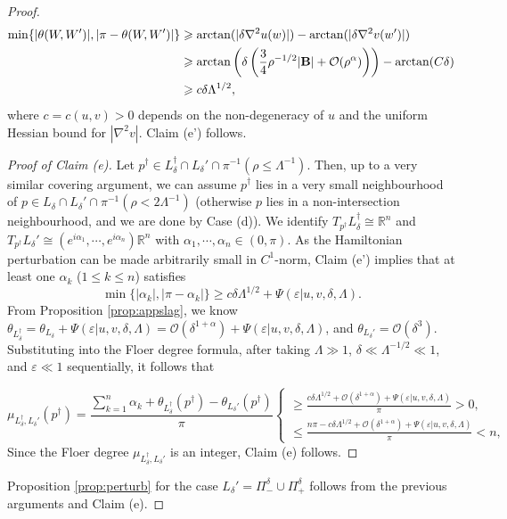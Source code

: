 \documentclass[11pt,a4paper]{article}
\numberwithin{equation}{section}%
\theoremstyle{definition}
\newcommand{\R}{\mathbb{R}}
\begin{document}
\begin{proof}
\begin{equation*}
    \begin{aligned}
        \min \{|\theta(W,W')|,|\pi-\theta(W,W')|\}&\geqslant \arctan(|\delta\nabla^2u(w)|)-\arctan (|\delta \nabla^2v(w')|)
        \\& \geqslant \arctan\left(\delta \left(\frac{3}{4}\rho^{-1/2}|{\bf{B}}|+\mathcal{O}(\rho^{\alpha})\right)\right)-\arctan(C\delta) 
        \\& \geqslant c\delta \Lambda^{1/2}, 
    \end{aligned}
\end{equation*}
where $c=c(u,v)>0$ depends on the non-degeneracy of $u$ and the uniform Hessian bound for $|\nabla^2 v|$. Claim (e') follows. 
\begin{proof}[Proof of Claim (e)]
   Let $p^\dagger\in L_\delta^\dagger\cap L_\delta'\cap \pi^{-1}(\rho\leqslant \Lambda^{-1})$. Then, up to a very similar covering argument, we can assume $p^\dagger$ lies in a very small neighbourhood of $p\in L_\delta\cap L_\delta'\cap \pi^{-1}(\rho <2\Lambda^{-1})$ (otherwise $p$ lies in a non-intersection neighbourhood, and we are done by Case (d)). We identify $T_{p^\dagger}L_\delta^\dagger\cong \R^n$ and $T_{p^{\dagger}}L_{\delta}'\cong (e^{i\alpha_1},\cdots,e^{i\alpha_n})\R^n$ with $\alpha_1,\cdots,\alpha_n\in (0,\pi)$. As the Hamiltonian perturbation can be made arbitrarily small in $C^1$-norm, Claim (e') implies that at least one $\alpha_k$ ($1\leqslant k\leqslant n$) satisfies
    $$\min\{|\alpha_k|,|\pi-\alpha_k|\}\geqslant c\delta \Lambda^{1/2}+\Psi(\varepsilon|u,v,\delta,\Lambda).$$
    From Proposition \ref{prop:appslag}, we know $\theta_{L_\delta^\dagger}=\theta_{L_\delta}+\Psi(\varepsilon|u,v,\delta,\Lambda)=\mathcal{O}(\delta^{1+\alpha})+\Psi(\varepsilon|u,v,\delta,\Lambda)$, and $\theta_{L_\delta'}=\mathcal{O}(\delta^3)$. Substituting into the Floer degree formula, after taking $\Lambda\gg 1$, $\delta \ll\Lambda^{-1/2}\ll1 $, and $\varepsilon \ll1$ sequentially, it follows that
    
    $$\mu_{L_\delta^{\dagger},L_{\delta}'}(p^\dagger)=\frac{\sum\limits_{k=1}^n\alpha_k+\theta_{L_\delta^\dagger}(p^\dagger)-\theta_{L_\delta'}(p^\dagger)}{\pi}\left\{\begin{array}{l}
        \geqslant \frac{c\delta \Lambda^{1/2}+\mathcal{O}(\delta^{1+\alpha})+\Psi(\varepsilon|u,v,\delta,\Lambda)}{\pi}>0,   \\
        \leqslant \frac{n\pi -c\delta\Lambda^{1/2}+\mathcal{O}(\delta^{1+\alpha})+\Psi(\varepsilon|u,v,\delta,\Lambda)}{\pi}<n, 
    \end{array}\right.$$
Since the Floer degree $\mu_{L_\delta^{\dagger},L_{\delta}'}$ is an integer, Claim (e) follows. 
\end{proof}
Proposition \ref{prop:perturb} for the case $L_\delta'=\Pi_-^\delta\cup \Pi_+^\delta$ follows from the previous arguments and Claim (e). 
\end{proof}
\end{document}
